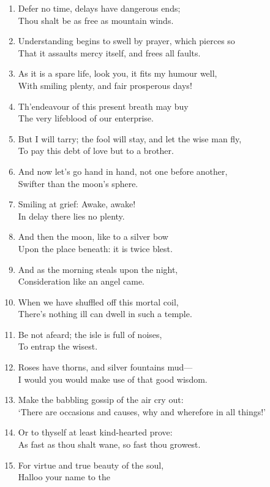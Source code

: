 \documentclass[17pt]{extarticle}
\begin{document}
\begin{enumerate}
\item
  Defer no time, delays have dangerous ends;\\Thou shalt be as free as
  mountain winds.
\item
  Understanding begins to swell by prayer, which pierces so\\That it
  assaults mercy itself, and frees all faults.
\item
  As it is a spare life, look you, it fits my humour well,\\With smiling
  plenty, and fair prosperous days!
\item
  Th'endeavour of this present breath may buy\\The very lifeblood of our
  enterprise.
\item
  But I will tarry; the fool will stay, and let the wise man fly,\\To
  pay this debt of love but to a brother.
\item
  And now let's go hand in hand, not one before another,\\Swifter than
  the moon's sphere.
\item
  Smiling at grief: Awake, awake!\\In delay there lies no plenty.
\item
  And then the moon, like to a silver bow\\Upon the place beneath: it is
  twice blest.
\item
  And as the morning steals upon the night,\\Consideration like an angel
  came.
\item
  When we have shuffled off this mortal coil,\\There's nothing ill can
  dwell in such a temple.
\item
  Be not afeard; the isle is full of noises,\\To entrap the wisest.
\item
  Roses have thorns, and silver fountains mud---\\I would you would make
  use of that good wisdom.
\item
  Make the babbling gossip of the air cry out:\\`There are occasions and
  causes, why and wherefore in all things!'
\item
  Or to thyself at least kind-hearted prove:\\As fast as thou shalt
  wane, so fast thou growest.
\item
  For virtue and true beauty of the soul,\\Halloo your name to the

\end{enumerate}
\end{document}
